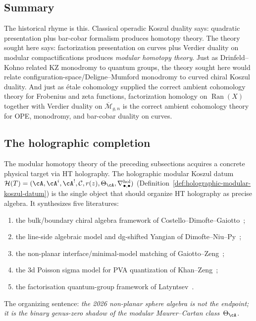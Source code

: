 \subsection{Summary}

The historical rhyme is this. Classical operadic Koszul duality
says: quadratic presentation plus bar-cobar formalism produces
homotopy theory. The theory sought here says: factorization
presentation on curves plus Verdier duality on modular
compactifications produces \emph{modular homotopy theory}. Just as
Drinfeld--Kohno related KZ monodromy to quantum groups, the theory
sought here would relate configuration-space/Deligne--Mumford
monodromy to curved chiral Koszul duality. And just as \'etale
cohomology supplied the correct ambient cohomology theory for
Frobenius and zeta functions, factorization homology on
$\operatorname{Ran}(X)$ together with Verdier duality on
$\overline{\mathcal{M}}_{g,n}$ is the correct ambient cohomology
theory for OPE, monodromy, and bar-cobar duality on curves.

\subsection{The holographic completion}
\label{subsec:concordance-holographic-completion}

The modular homotopy theory of the preceding subsections acquires a
concrete physical target via HT holography. The holographic modular
Koszul datum
$\mathcal{H}(T) = (\cA,\cA^i,\cA^!,\mathcal{C}, r(z), \Theta_\cA,
\nabla^{\mathrm{hol}}_{\bullet,\bullet})$
(Definition~\ref{def:holographic-modular-koszul-datum})
is the single object that should organize HT holography as precise
algebra. It synthesizes five literatures:
\begin{enumerate}[label=\textup{(\roman*)}]
\item the bulk/boundary chiral algebra framework of
 Costello--Dimofte--Gaiotto~\cite{CDG20};
\item the line-side algebraic model and dg-shifted Yangian of
 Dimofte--Niu--Py~\cite{DNP25};
\item the non-planar interface/minimal-model matching of
 Gaiotto--Zeng~\cite{GZ26};
\item the 3d Poisson sigma model for PVA quantization of
 Khan--Zeng~\cite{KhanZeng25};
\item the factorisation quantum-group framework of
 Latyntsev~\cite{Latyntsev23}.
\end{enumerate}
The organizing sentence: \emph{the 2026 non-planar sphere algebra
is not the endpoint; it is the binary genus-zero shadow of the
modular Maurer--Cartan class~$\Theta_\cA$.}

